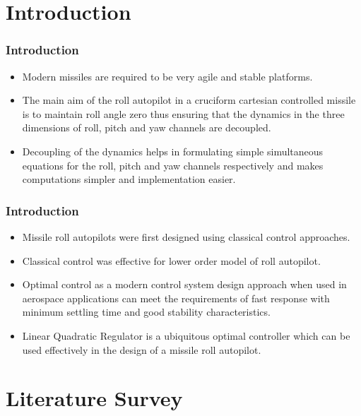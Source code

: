 \documentclass[10pt]{beamer}
\begin{document}
\section{ Introduction}
\begin{frame}
\frametitle{Introduction}
\begin{itemize}
\item  Modern missiles are required to be very agile and stable platforms. \bigskip
\item  The main aim of the roll autopilot in a cruciform cartesian controlled missile is to maintain roll angle zero thus ensuring that the dynamics in the three dimensions of roll, pitch and yaw channels are decoupled. \bigskip
\item  Decoupling of the dynamics helps in formulating simple simultaneous equations for the roll, pitch and yaw channels respectively and makes computations
simpler and implementation easier. \bigskip
\end{itemize}
\end{frame}
\begin{frame}
\frametitle{Introduction}
\begin{itemize}
\item  Missile roll autopilots were first designed using classical control approaches. \bigskip
\item  Classical control was effective for lower order model of roll autopilot. \bigskip
\item  Optimal control as a modern control system design approach when used in aerospace applications can meet the requirements of fast response with minimum settling time and good stability characteristics. \bigskip
\item  Linear Quadratic Regulator is a ubiquitous optimal controller which can be used effectively in the design of a missile roll autopilot. \bigskip
\end{itemize}
\end{frame}
\section{ Literature Survey}
\end{document}
